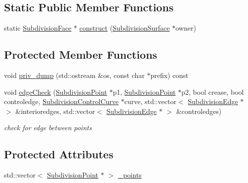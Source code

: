 \subsection*{Static Public Member Functions}
\begin{DoxyCompactItemize}
\item 
static \hyperlink{classShipCADGeometry_1_1SubdivisionFace}{Subdivision\-Face} $\ast$ \hyperlink{classShipCADGeometry_1_1SubdivisionFace_a4a6f182fa7e5cf63fc95c7614805f136}{construct} (\hyperlink{classShipCADGeometry_1_1SubdivisionSurface}{Subdivision\-Surface} $\ast$owner)
\end{DoxyCompactItemize}
\subsection*{Protected Member Functions}
\begin{DoxyCompactItemize}
\item 
void \hyperlink{classShipCADGeometry_1_1SubdivisionFace_ab2f647963b552728f40d8c329318676e}{priv\-\_\-dump} (std\-::ostream \&os, const char $\ast$prefix) const 
\item 
void \hyperlink{classShipCADGeometry_1_1SubdivisionFace_a5399f7ec8ed458f6dbc733688c006cf8}{edge\-Check} (\hyperlink{classShipCADGeometry_1_1SubdivisionPoint}{Subdivision\-Point} $\ast$p1, \hyperlink{classShipCADGeometry_1_1SubdivisionPoint}{Subdivision\-Point} $\ast$p2, bool crease, bool controledge, \hyperlink{classShipCADGeometry_1_1SubdivisionControlCurve}{Subdivision\-Control\-Curve} $\ast$curve, std\-::vector$<$ \hyperlink{classShipCADGeometry_1_1SubdivisionEdge}{Subdivision\-Edge} $\ast$ $>$ \&interioredges, std\-::vector$<$ \hyperlink{classShipCADGeometry_1_1SubdivisionEdge}{Subdivision\-Edge} $\ast$ $>$ \&controledges)
\begin{DoxyCompactList}\small\item\em check for edge between points \end{DoxyCompactList}\end{DoxyCompactItemize}
\subsection*{Protected Attributes}
\begin{DoxyCompactItemize}
\item 
std\-::vector$<$ \hyperlink{classShipCADGeometry_1_1SubdivisionPoint}{Subdivision\-Point} $\ast$ $>$ \hyperlink{classShipCADGeometry_1_1SubdivisionFace_a1442d01623618d3bd3d231ac2f61bdf2}{\-\_\-points}
\end{DoxyCompactItemize}

